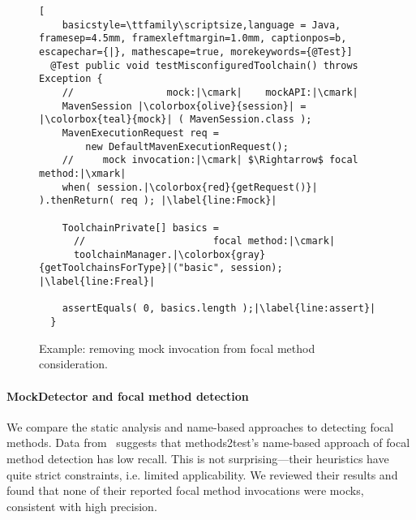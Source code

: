 \begin{figure}[h]
	\begin{lstlisting}[
	basicstyle=\ttfamily\scriptsize,language = Java, framesep=4.5mm, framexleftmargin=1.0mm, captionpos=b, escapechar={|}, mathescape=true, morekeywords={@Test}]
  @Test public void testMisconfiguredToolchain() throws Exception {
    //                mock:|\cmark|    mockAPI:|\cmark|
    MavenSession |\colorbox{olive}{session}| = |\colorbox{teal}{mock}| ( MavenSession.class );
    MavenExecutionRequest req =
        new DefaultMavenExecutionRequest();
    //     mock invocation:|\cmark| $\Rightarrow$ focal method:|\xmark|
    when( session.|\colorbox{red}{getRequest()}| ).thenReturn( req ); |\label{line:Fmock}|

    ToolchainPrivate[] basics =
      //                      focal method:|\cmark|
      toolchainManager.|\colorbox{gray}{getToolchainsForType}|("basic", session); |\label{line:Freal}|

    assertEquals( 0, basics.length );|\label{line:assert}|
  }
  \end{lstlisting}

  \caption{Example: removing mock invocation from focal method consideration.}
  \label{fig:mockExampleEvaluation}
\end{figure}

\paragraph{MockDetector and focal method detection}
We compare the static analysis and name-based approaches to detecting focal methods.
Data from~\cite{tufano2020unit} suggests that methods2test's name-based approach of focal method detection has low recall. This is not surprising---their heuristics have quite strict constraints, i.e. limited applicability. We reviewed their results and found that none of their reported focal method invocations were mocks, consistent with high precision.

